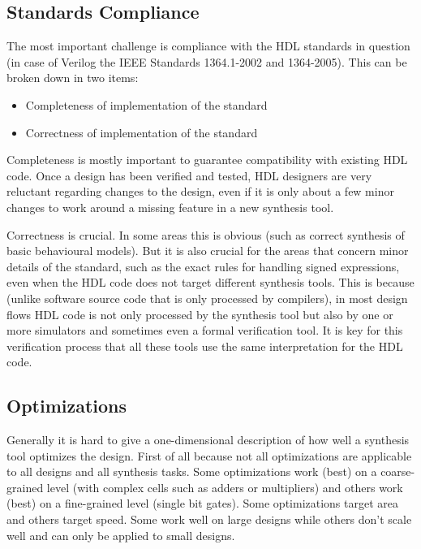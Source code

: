 \subsection{Standards Compliance}

The most important challenge is compliance with the HDL standards in question (in case
of Verilog the IEEE Standards 1364.1-2002 and 1364-2005). This can be broken down in two
items:

\begin{itemize}
\item Completeness of implementation of the standard
\item Correctness of implementation of the standard
\end{itemize}

Completeness is mostly important to guarantee compatibility
with existing HDL code. Once a design has been verified and tested, HDL designers
are very reluctant regarding changes to the design, even if it is only about
a few minor changes to work around a missing feature in a new synthesis tool.

Correctness is crucial. In some areas this is obvious (such as
correct synthesis of basic behavioural models). But it is also crucial for the
areas that concern minor details of the standard, such as the exact rules
for handling signed expressions, even when the HDL code does not target
different synthesis tools. This is because (unlike software source code that
is only processed by compilers), in most design flows HDL code is not only
processed by the synthesis tool but also by one or more simulators and sometimes
even a formal verification tool. It is key for this verification process
that all these tools use the same interpretation for the HDL code.

\subsection{Optimizations}

Generally it is hard to give a one-dimensional description of how well a synthesis tool
optimizes the design. First of all because not all optimizations are applicable to all
designs and all synthesis tasks. Some optimizations work (best) on a coarse-grained level
(with complex cells such as adders or multipliers) and others work (best) on a fine-grained
level (single bit gates). Some optimizations target area and others target speed.
Some work well on large designs while others don't scale well and can only be applied
to small designs.

